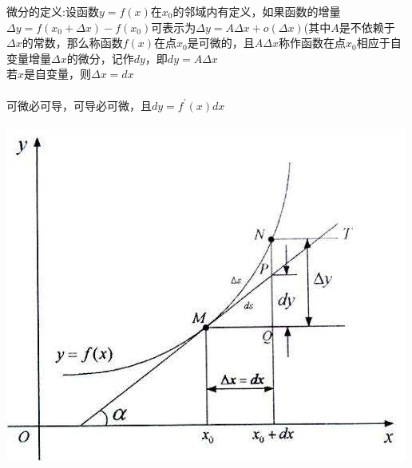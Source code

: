 \documentclass{article}
\begin{document}
\begin{flushleft}
	微分的定义:设函数$y=f(x)$在$x_0$的邻域内有定义，如果函数的增量$\Delta y = f(x_0 + \Delta x) − f(x_0)$可表示为$ \Delta y = A\Delta x + o(\Delta x)$(其中$A$是不依赖于$\Delta x$的常数，那么称函数$f(x)$在点$x_0$是可微的，且$A\Delta x$称作函数在点$x_0$相应于自变量增量$\Delta x$的微分，记作$dy$，即$dy = A\Delta x$\\
	若$x$是自变量，则$\Delta x=dx$\\
	~\\
	可微必可导，可导必可微，且$dy=f^{'}(x)dx$\\
	~\\
	\includegraphics[scale=1.0]{1.jpg}
	
\end{flushleft}
\end{document}

